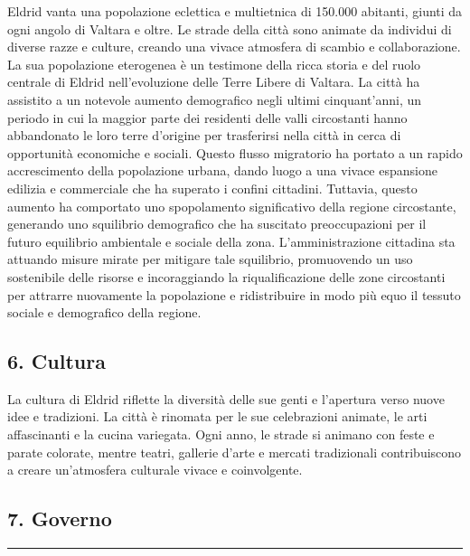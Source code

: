 Eldrid vanta una popolazione eclettica e multietnica di 150.000
abitanti, giunti da ogni angolo di Valtara e oltre. Le strade della
città sono animate da individui di diverse razze e culture, creando una
vivace atmosfera di scambio e collaborazione. La sua popolazione
eterogenea è un testimone della ricca storia e del ruolo centrale di
Eldrid nell'evoluzione delle Terre Libere di Valtara. La città ha
assistito a un notevole aumento demografico negli ultimi cinquant'anni,
un periodo in cui la maggior parte dei residenti delle valli circostanti
hanno abbandonato le loro terre d'origine per trasferirsi nella città in
cerca di opportunità economiche e sociali. Questo flusso migratorio ha
portato a un rapido accrescimento della popolazione urbana, dando luogo
a una vivace espansione edilizia e commerciale che ha superato i confini
cittadini. Tuttavia, questo aumento ha comportato uno spopolamento
significativo della regione circostante, generando uno squilibrio
demografico che ha suscitato preoccupazioni per il futuro equilibrio
ambientale e sociale della zona. L'amministrazione cittadina sta
attuando misure mirate per mitigare tale squilibrio, promuovendo un uso
sostenibile delle risorse e incoraggiando la riqualificazione delle zone
circostanti per attrarre nuovamente la popolazione e ridistribuire in
modo più equo il tessuto sociale e demografico della regione.

\subsection{6. Cultura}\label{cultura}

La cultura di Eldrid riflette la diversità delle sue genti e l'apertura
verso nuove idee e tradizioni. La città è rinomata per le sue
celebrazioni animate, le arti affascinanti e la cucina variegata. Ogni
anno, le strade si animano con feste e parate colorate, mentre teatri,
gallerie d'arte e mercati tradizionali contribuiscono a creare
un'atmosfera culturale vivace e coinvolgente.

\subsection{7. Governo}\label{governo}

\begin{center}\rule{0.5\linewidth}{0.5pt}\end{center}

